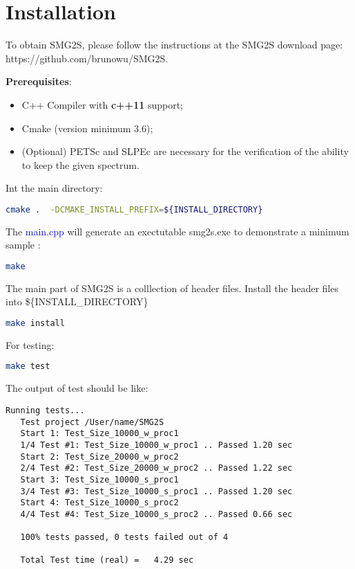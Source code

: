 \documentclass[letterpaper, 10 pt]{report}
\begin{document}
	\section{Installation}
	To obtain SMG2S, please follow the instructions at the SMG2S download page: https://github.com/brunowu/SMG2S.
	
	\textbf{Prerequisites}:
	
	\begin{itemize}
		\item C++ Compiler with \textbf{c++11} support;
		\item Cmake (version minimum 3.6);
		\item (Optional) PETSc and SLPEc are necessary for the verification of the ability to keep the given spectrum.
	\end{itemize}
	
	Int the main directory:
	
	\begin{lstlisting}[language=bash,frame=single]
   cmake .  -DCMAKE_INSTALL_PREFIX=${INSTALL_DIRECTORY}
	\end{lstlisting}
	
	The \textcolor{blue}{main.cpp} will generate an exectutable smg2s.exe to demonstrate a minimum sample :

	\begin{lstlisting}[language=bash, frame=single]
   make
	\end{lstlisting}

	The main part of SMG2S is a colllection of header files. Install the header files into \$\{INSTALL\_DIRECTORY\}

	\begin{lstlisting}[language=bash,frame=single]
   make install
	\end{lstlisting}

	For testing:
	
	\begin{lstlisting}[language=bash,frame=single]
   make test
	\end{lstlisting}
	
	The output of test should be like:
\begin{lstlisting}[frame=single]
   Running tests...
   Test project /User/name/SMG2S
   Start 1: Test_Size_10000_w_proc1
   1/4 Test #1: Test_Size_10000_w_proc1 .. Passed 1.20 sec
   Start 2: Test_Size_20000_w_proc2
   2/4 Test #2: Test_Size_20000_w_proc2 .. Passed 1.22 sec
   Start 3: Test_Size_10000_s_proc1
   3/4 Test #3: Test_Size_10000_s_proc1 .. Passed 1.20 sec
   Start 4: Test_Size_10000_s_proc2
   4/4 Test #4: Test_Size_10000_s_proc2 .. Passed 0.66 sec

   100% tests passed, 0 tests failed out of 4

   Total Test time (real) =   4.29 sec
\end{lstlisting}
\end{document}
